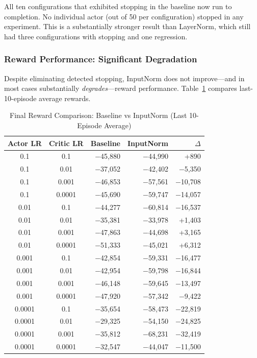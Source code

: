 All ten configurations that exhibited stopping in the baseline now run to completion. No individual actor (out of 50 per configuration) stopped in any experiment. This is a substantially stronger result than LayerNorm, which still had three configurations with stopping and one regression.

\subsubsection{Reward Performance: Significant Degradation}

Despite eliminating detected stopping, InputNorm does not improve---and in most cases substantially \textit{degrades}---reward performance. Table~\ref{tab:inputnorm_rewards} compares last-10-episode average rewards.

\begin{table}[htbp]
\caption{Final Reward Comparison: Baseline vs InputNorm (Last 10-Episode Average)}
\label{tab:inputnorm_rewards}
\centering
\small
\begin{tabular}{ccrrr}
\toprule
\textbf{Actor LR} & \textbf{Critic LR} & \textbf{Baseline} & \textbf{InputNorm} & \textbf{$\Delta$} \\
\midrule
0.1 & 0.1 & $-$45,880 & $-$44,990 & +890 \\
0.1 & 0.01 & $-$37,052 & $-$42,402 & $-$5,350 \\
0.1 & 0.001 & $-$46,853 & $-$57,561 & $-$10,708 \\
0.1 & 0.0001 & $-$45,690 & $-$59,747 & $-$14,057 \\
0.01 & 0.1 & $-$44,277 & $-$60,814 & $-$16,537 \\
0.01 & 0.01 & $-$35,381 & $-$33,978 & +1,403 \\
0.01 & 0.001 & $-$47,863 & $-$44,698 & +3,165 \\
0.01 & 0.0001 & $-$51,333 & $-$45,021 & +6,312 \\
0.001 & 0.1 & $-$42,854 & $-$59,331 & $-$16,477 \\
0.001 & 0.01 & $-$42,954 & $-$59,798 & $-$16,844 \\
0.001 & 0.001 & $-$46,148 & $-$59,645 & $-$13,497 \\
0.001 & 0.0001 & $-$47,920 & $-$57,342 & $-$9,422 \\
0.0001 & 0.1 & $-$35,654 & $-$58,473 & $-$22,819 \\
0.0001 & 0.01 & $-$29,325 & $-$54,150 & $-$24,825 \\
0.0001 & 0.001 & $-$35,812 & $-$68,231 & $-$32,419 \\
0.0001 & 0.0001 & $-$32,547 & $-$44,047 & $-$11,500 \\
\bottomrule
\end{tabular}
\end{table}

